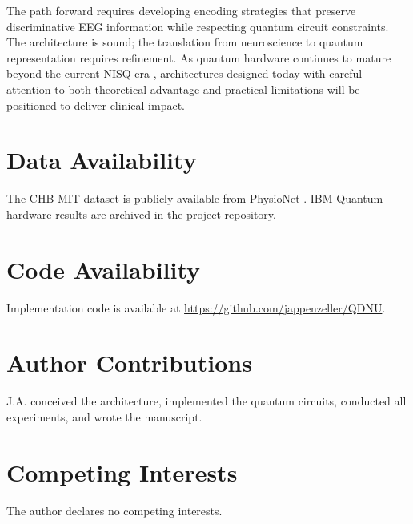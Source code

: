 \documentclass[pdflatex,sn-mathphys-num]{sn-jnl}
\begin{document}
The path forward requires developing encoding strategies that preserve discriminative EEG information while respecting quantum circuit constraints. The architecture is sound; the translation from neuroscience to quantum representation requires refinement. As quantum hardware continues to mature beyond the current NISQ era \cite{preskill2018}, architectures designed today with careful attention to both theoretical advantage and practical limitations will be positioned to deliver clinical impact.

\section*{Data Availability}
The CHB-MIT dataset is publicly available from PhysioNet \cite{goldberger2000}. IBM Quantum hardware results are archived in the project repository.

\section*{Code Availability}
Implementation code is available at \url{https://github.com/jappenzeller/QDNU}.

\section*{Author Contributions}
J.A. conceived the architecture, implemented the quantum circuits, conducted all experiments, and wrote the manuscript.

\section*{Competing Interests}
The author declares no competing interests.


\end{document}
